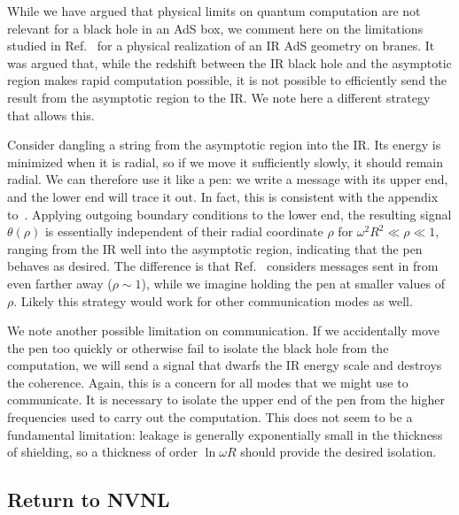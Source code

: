 \documentclass[12pt]{article}
\begin{document}
{{While we have argued that physical limits on quantum computation are not relevant for a black hole in an AdS box, we comment here on the limitations studied in Ref.~\cite{Harlow:2013tf} for a physical realization of an IR  AdS geometry on branes.  It was argued that, while the redshift between the IR black hole and the asymptotic region makes rapid computation possible, it is not possible to efficiently send the result  from the asymptotic region  to the IR.  We note here a different strategy that allows this.

Consider dangling a string from the asymptotic region into the IR. {Its energy is minimized when it is radial, so if we} move it sufficiently slowly, it should remain radial.  We can therefore use it like a pen: we write a message with its upper end, and the lower end will trace it out.  {In fact, this is consistent with the appendix to~\cite{Harlow:2013tf}. Applying} outgoing boundary conditions to the lower end, the resulting signal $\theta(\rho)$ is essentially independent of their radial coordinate $\rho$ for $\omega^2 R^2 \ll \rho \ll 1$, ranging from the IR well into the asymptotic region, indicating that the pen behaves as desired.  The difference is that Ref.~\cite{Harlow:2013tf} considers messages sent in from even farther away ($\rho \sim 1$), while we imagine holding the pen at smaller values of $\rho.$  Likely this strategy would work for other communication modes as well.

We note another possible limitation on communication.  If we accidentally move the pen too quickly or otherwise fail to isolate the black hole from the computation, we will send a signal that dwarfs the IR energy scale and destroys the coherence. Again, this is a concern for all modes that we might use to communicate.  It is necessary to isolate the upper end of the pen from the higher frequencies used to carry out the computation.
This does not seem to be a fundamental limitation:
leakage is generally exponentially small in the thickness of shielding, so a thickness of order $\ln \omega R$ should provide the desired isolation.

\subsection{Return to NVNL}
\label{RNL}

}}
\end{document}
